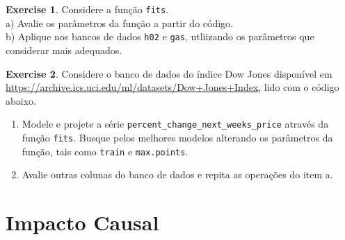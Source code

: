 \documentclass[
]{book}
\newenvironment{Shaded}{\begin{snugshade}}{\end{snugshade}}
\newcommand{\DataTypeTok}[1]{\textcolor[rgb]{0.13,0.29,0.53}{#1}}
\newcommand{\KeywordTok}[1]{\textcolor[rgb]{0.13,0.29,0.53}{\textbf{#1}}}
\newcommand{\NormalTok}[1]{#1}
\newcommand{\OperatorTok}[1]{\textcolor[rgb]{0.81,0.36,0.00}{\textbf{#1}}}
\newcommand{\StringTok}[1]{\textcolor[rgb]{0.31,0.60,0.02}{#1}}
\providecommand{\tightlist}{%
  \setlength{\itemsep}{0pt}\setlength{\parskip}{0pt}}
\theoremstyle{definition}
\theoremstyle{definition}
\theoremstyle{definition}
\newtheorem{exercise}{Exercise}[chapter]
\theoremstyle{remark}
\begin{document}
\begin{exercise}
\protect\hypertarget{exr:unnamed-chunk-180}{}{\label{exr:unnamed-chunk-180} }Considere a função \texttt{fits}.\\
a) Avalie os parâmetros da função a partir do código.\\
b) Aplique nos bancos de dados \texttt{h02} e \texttt{gas}, utliizando os parâmetros que considerar mais adequados.\\
\end{exercise}

\begin{exercise}
\protect\hypertarget{exr:unnamed-chunk-181}{}{\label{exr:unnamed-chunk-181} }Considere o banco de dados do índice Dow Jones disponível em \url{https://archive.ics.uci.edu/ml/datasets/Dow+Jones+Index}, lido com o código abaixo.
\end{exercise}

\begin{Shaded}
\end{Shaded}

\begin{enumerate}
\def\labelenumi{\alph{enumi}.}
\tightlist
\item
  Modele e projete a série \texttt{percent\_change\_next\_weeks\_price} através da função \texttt{fits}. Busque pelos melhores modelos alterando os parâmetros da função, tais como \texttt{train} e \texttt{max.points}.\\
\item
  Avalie outras colunas do banco de dados e repita as operações do item a.
\end{enumerate}

\hypertarget{impacto-causal}{%
\section{Impacto Causal}\label{impacto-causal}}
\end{document}
